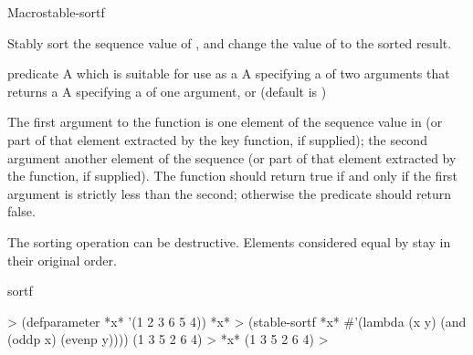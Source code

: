 \documentclass[10pt,twoside,english,pdftex]{article}
\begin{document}
\begin{functiondoc}{Macro}{stable-sortf}{
    }
%

\fnsyntax

\fnpurpose Stably sort the sequence value of , and change the value of
 to the sorted result.

\fnpackage {}

\fnmodule {}

\fnargs
\begin{args}{predicate}
\arg[place] A  which is suitable for use as a
\arg[predicate] A  specifying a
   of two arguments that returns a
\arg[key] A  specifying a 
  of one argument, or \nil{} (default is \nil)
\end{args}

\fndescription
%
The first argument to the  function is one element of the
sequence value in  (or part of that element extracted by the key
function, if supplied); the second argument another element of the sequence
(or part of that element extracted by the  function, if
supplied). The  function should return true if and only if
the first argument is strictly less than the second; otherwise the predicate
should return false.

The sorting operation can be destructive. Elements considered equal by
 stay in their original order.

\begin{alsos}{sortf}
\also[sortf]
\end{alsos}

\fnexample
\begin{example}
%
\W\supp
  > (defparameter *x* '(1 2 3 6 5 4))
  *x*
  > (stable-sortf *x* #'(lambda (x y) (and (oddp x) (evenp y))))
  (1 3 5 2 6 4)
  > *x*
  (1 3 5 2 6 4)
  >
\end{example}

\end{functiondoc}

\end{document}
